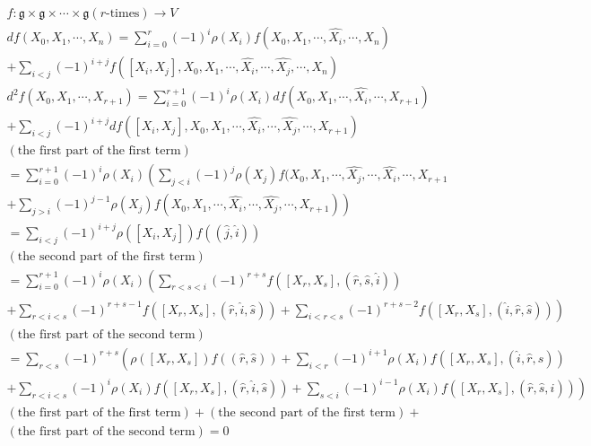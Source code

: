 \documentclass{article}
\newcommand{\lie}[1]{\mathfrak{#1}}
\begin{document}
\begin{eqnarray*}
  f : \lie{g} \times \lie{g} \times \cdots \times \lie{g} (\textrm{$r$-times}) \to V \\
  df(X_0, X_1, \cdots, X_n) = \sum_{i = 0}^r (-1)^i \rho(X_i) f(X_0, X_1, \cdots, \hat{X_i}, \cdots, X_n) \\ 
    + \sum_{i < j} (-1)^{i + j} f([X_i, X_j], X_0, X_1, \cdots, \hat{X_i}, \cdots, \hat{X_j}, \cdots, X_n) \\
  d^2 f(X_0, X_1, \cdots, X_{r + 1}) = \sum_{i = 0}^{r + 1} (-1)^i \rho(X_i) df(X_0, X_1, \cdots, \hat{X_i}, \cdots, X_{r + 1}) \\ 
    + \sum_{i < j} (-1)^{i + j} df([X_i, X_j], X_0, X_1, \cdots, \hat{X_i}, \cdots, \hat{X_j}, \cdots, X_{r + 1}) \\
  (\textrm{the first part of the first term}) \\
  = \sum_{i = 0}^{r + 1} (-1)^i \rho(X_i) \left( \sum_{j < i} (-1)^j \rho(X_j) f(X_0, X_1, \cdots, \hat{X_j}, \cdots, \hat{X_i}, \cdots, X_{r + 1} \right. \\ 
    \left. + \sum_{j > i} (-1)^{j - 1} \rho(X_j) f(X_0, X_1, \cdots, \hat{X_i}, \cdots, \hat{X_j}, \cdots, X_{r + 1}) \right) \\ 
    = \sum_{i < j} (-1)^{i + j} \rho([X_i, X_j]) f((\hat{j}, \hat{i})) \\
  (\textrm{the second part of the first term}) \\
  = \sum_{i = 0}^{r + 1} (-1)^i \rho(X_i) \left( \sum_{r < s < i} (-1)^{r + s} f([X_r, X_s], (\hat{r}, \hat{s}, \hat{i})) \right. \\
    \left. + \sum_{r < i < s} (-1)^{r + s - 1} f([X_r, X_s], (\hat{r}, \hat{i}, \hat{s})) + \sum_{i < r < s} (-1)^{r + s - 2} f([X_r, X_s], (\hat{i}, \hat{r}, \hat{s})) \right) \\
  (\textrm{the first part of the second term}) \\
  = \sum_{r < s} (-1)^{r + s} \left( \rho([X_r, X_s]) f((\hat{r}, \hat{s})) + \sum_{i < r} (-1)^{i + 1} \rho(X_i) f([X_r, X_s], (\hat{i}, \hat{r}, \hat{s})) \right. \\
    \left. + \sum_{r < i < s} (-1)^{i} \rho(X_i) f([X_r, X_s], (\hat{r}, \hat{i}, \hat{s})) + \sum_{s < i} (-1)^{i - 1} \rho(X_i) f([X_r, X_s], (\hat{r}, \hat{s}, \hat{i})) \right) \\
  (\textrm{the first part of the first term}) + (\textrm{the second part of the first term}) + \\ 
  (\textrm{the first part of the second term}) = 0
\end{eqnarray*}
\end{document}
